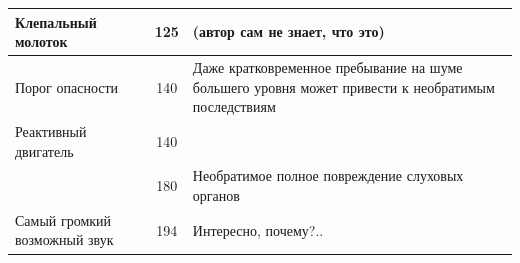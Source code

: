 \begin{center}
\begin{longtable}{|p{}|c|p{}|}
    \hline
    Клепальный молоток           & 125           & \small{(автор сам не знает, что это)}          \\
    \hline
    Порог опасности              & 140           & \small{Даже кратковременное пребывание на
      шуме большего уровня может привести к необратимым последствиям}                             \\
    \hline
    Реактивный двигатель         & 140           &                                                \\
                                 & 180           & \small{Необратимое полное повреждение
      слуховых органов}                                                                           \\
    Самый громкий возможный звук & 194           & \small{Интересно, почему?..}                   \\
  \end{longtable}
\end{center}

